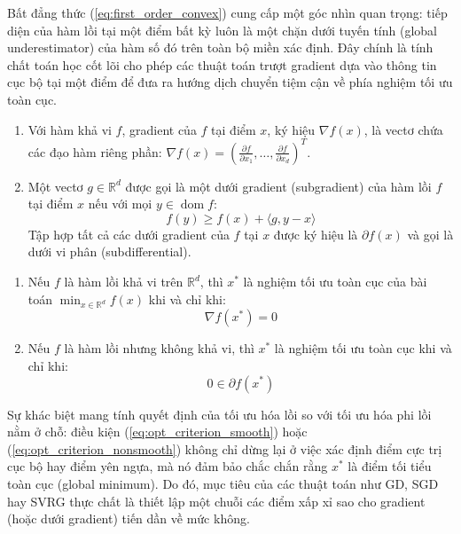 Bất đẳng thức (\ref{eq:first_order_convex}) cung cấp một góc nhìn quan trọng: tiếp diện của hàm lồi tại một điểm bất kỳ luôn là một chặn dưới tuyến tính (global underestimator) của hàm số đó trên toàn bộ miền xác định. Đây chính là tính chất toán học cốt lõi cho phép các thuật toán trượt gradient dựa vào thông tin cục bộ tại một điểm để đưa ra hướng dịch chuyển tiệm cận về phía nghiệm tối ưu toàn cục.

\begin{definition}
\label{def:gradient_subgradient}
\leavevmode
\begin{enumerate}
    \item Với hàm khả vi $f$, gradient của $f$ tại điểm $x$, ký hiệu $\nabla f(x)$, là vectơ chứa các đạo hàm riêng phần: $\nabla f(x) = \left( \frac{\partial f}{\partial x_1}, \dots, \frac{\partial f}{\partial x_d} \right)^T$.
    \item Một vectơ $g \in \mathbb{R}^d$ được gọi là một dưới gradient (subgradient) của hàm lồi $f$ tại điểm $x$ nếu với mọi $y \in \operatorname{dom} f$:
    \begin{equation}
    f(y) \ge f(x) + \langle g, y - x \rangle
    \end{equation}
    Tập hợp tất cả các dưới gradient của $f$ tại $x$ được ký hiệu là $\partial f(x)$ và gọi là dưới vi phân (subdifferential).
\end{enumerate}
\end{definition}

\begin{theorem}
\label{thm:optimality_condition}
\leavevmode
\begin{enumerate}
    \item Nếu $f$ là hàm lồi khả vi trên $\mathbb{R}^d$, thì $x^*$ là nghiệm tối ưu toàn cục của bài toán $\min_{x \in \mathbb{R}^d} f(x)$ khi và chỉ khi:
    \begin{equation}\label{eq:opt_criterion_smooth}
    \nabla f(x^*) = 0
    \end{equation}
    \item Nếu $f$ là hàm lồi nhưng không khả vi, thì $x^*$ là nghiệm tối ưu toàn cục khi và chỉ khi:
    \begin{equation}\label{eq:opt_criterion_nonsmooth}
    0 \in \partial f(x^*)
    \end{equation}
\end{enumerate}
\end{theorem}

Sự khác biệt mang tính quyết định của tối ưu hóa lồi so với tối ưu hóa phi lồi nằm ở chỗ: điều kiện (\ref{eq:opt_criterion_smooth}) hoặc (\ref{eq:opt_criterion_nonsmooth}) không chỉ dừng lại ở việc xác định điểm cực trị cục bộ hay điểm yên ngựa, mà nó đảm bảo chắc chắn rằng $x^*$ là điểm tối tiểu toàn cục (global minimum). Do đó, mục tiêu của các thuật toán như GD, SGD hay SVRG thực chất là thiết lập một chuỗi các điểm xấp xỉ sao cho gradient (hoặc dưới gradient) tiến dần về mức không.

